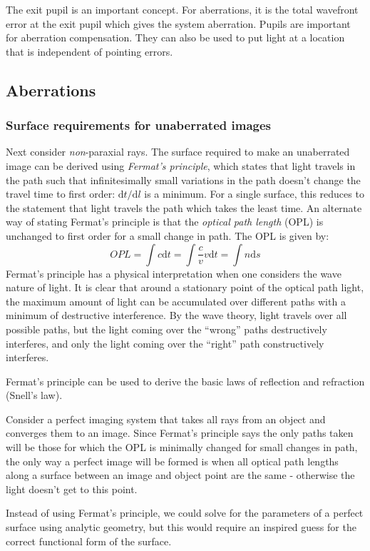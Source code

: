 \documentclass[12pt]{article}
\begin{document}
The exit pupil is an important concept. For aberrations, it is
the total wavefront error at the exit pupil which gives the system aberration.
Pupils are important for aberration compensation. They can also be used to
put light at a location that is independent of pointing errors.

\subsection{Aberrations}\label{ab}
\subsubsection{Surface requirements for unaberrated images}
Next consider \emph{non}-paraxial rays. The surface
required to make an unaberrated image can be derived using
\emph{Fermat's principle}, which
states that light travels in the path such that infinitesimally small
variations in the path doesn't change the travel time to first order:
$\textrm{d}t/\textrm{d}l$
is a minimum.
For a single surface, this reduces to
the statement that light travels the path which takes the least time.
An alternate way of stating Fermat's principle is that the \emph{optical path
length} (OPL) is unchanged to first order for a small change in path. The OPL
is given by:{$$
    OPL = \int{c\textrm{d}t} =
    \int{\frac{c}{v}v\textrm{d}t} =
    \int{n\textrm{d}s}
$$}Fermat's principle has a physical interpretation when one considers the
wave nature of light. It is clear that around a stationary point of the
optical path light, the maximum amount of light can be accumulated over
different paths with a minimum of destructive interference. By the wave
theory, light travels over all possible paths, but the light coming over
the ``wrong'' paths destructively interferes, and only the light coming over
the ``right'' path constructively interferes.

Fermat's principle can be used to derive the basic laws of reflection
and refraction (Snell's law).

Consider a perfect imaging system that takes all rays from an object
and converges them to an image. Since Fermat's principle says
the only paths taken will be those for which the OPL is minimally changed
for small changes in path, the only way a perfect image will be formed is
when all optical path lengths along a surface between an image and object
point are the same - otherwise the light doesn't get to this point.

Instead of using Fermat's principle, we could solve for the parameters
of a perfect surface using analytic geometry, but this would require an
inspired guess for the correct functional form of the surface.
\end{document}
